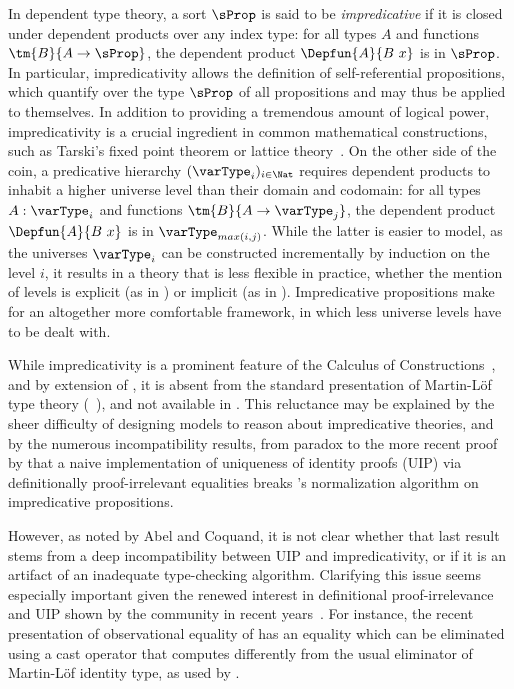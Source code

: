 In dependent type theory, a sort \( \sProp \) is said to be
\emph{impredicative} if it is closed under dependent products over any index
type: for all types \( A \) and functions \( \tm{B}{A \to \sProp} \),
the dependent product \( \Depfun{A}{B\ x} \) is in \( \sProp \).
%
In particular, impredicativity allows the definition of self-referential propositions,
which quantify over the type \( \sProp \) of all propositions and may thus
be applied to themselves.
%
In addition to providing a tremendous amount of logical power, impredicativity is
a crucial ingredient in common mathematical constructions, such as
Tarski's fixed point theorem or lattice theory~.
%
On the other side of the coin, a predicative hierarchy $(\varType_i)_{i \in \Nat}$
requires dependent products to inhabit a higher universe level
than their domain and codomain: for all types \( A : \varType_i \) and functions
\( \tm{B}{A \to \varType_j} \), the dependent product
\( \Depfun{A}{B\ x} \) is in \( \varType_{max(i,j)} \).
%
While the latter is easier to model, as the universes $\varType_i$ can be
constructed incrementally by induction on the level $i$, it results
in a theory that is less flexible in practice, whether the mention of
levels is explicit (as in \Agda) or implicit (as in \Coq).
%
Impredicative propositions make for an altogether
more comfortable framework, in which less universe levels have to
be dealt with.

While impredicativity is a prominent feature of the Calculus of
Constructions~, and by extension of \Coq, it is
absent from the standard presentation of Martin-Löf type theory
(\MLTT~), and not available in \Agda.
%
This reluctance may be explained by the sheer difficulty of designing models
to reason about impredicative theories, and by the numerous incompatibility
results, from  paradox to the more recent proof by
 that a naive implementation of uniqueness of identity
proofs (UIP) via definitionally proof-irrelevant equalities breaks \Coq's
normalization algorithm on impredicative propositions.

However, as noted by Abel and Coquand, it is not clear whether that last
result stems from a deep incompatibility between UIP and impredicativity,
or if it is an artifact of an inadequate type-checking algorithm.
%
Clarifying this issue seems especially important given the renewed
interest in definitional proof-irrelevance and UIP shown by the community
in recent years~.
%
For instance, the recent presentation \SetoidTT of observational
equality of  has an equality which can be
eliminated using a cast operator that computes differently from the
usual eliminator of Martin-Löf identity type, as used by .


